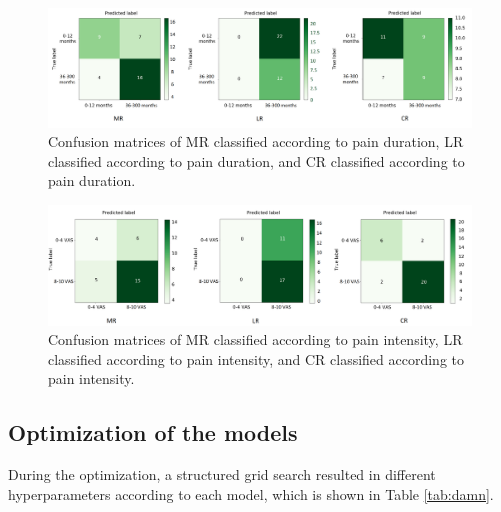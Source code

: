 \begin{figure} [b!]
    \includegraphics[width=1\textwidth]{Figures/samcon}
  \caption{Confusion matrices of MR classified according to pain duration, LR classified according to pain duration, and CR classified according to pain duration.}
  \label{fig:confma}
\end{figure}

\begin{figure} [t!]
    \includegraphics[width=1\textwidth]{Figures/samcon1}
  \caption{Confusion matrices of MR classified according to pain intensity, LR classified according to pain intensity, and CR classified according to pain intensity.}
  \label{fig:confma1}
\end{figure}

\vspace{-0.3cm}
\subsection{Optimization of the models}
During the optimization, a structured grid search resulted in different hyperparameters according to each model, which is shown in Table \ref{tab:damn}. 
\vspace{-0.2cm}

